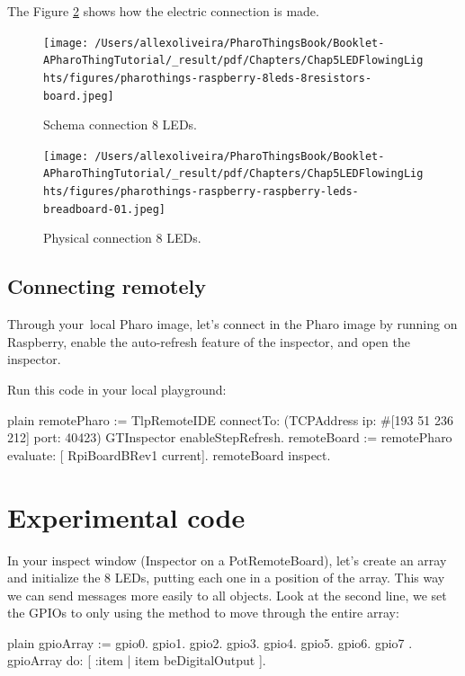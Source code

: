 \documentclass[10pt,twoside,english]{_support/latex/sbabook/sbabook}
\begin{document}
The Figure \ref{Physical8Leds} shows how the electric connection is made.


\begin{figure}

\begin{center}
\texttt{[image: /Users/allexoliveira/PharoThingsBook/Booklet-APharoThingTutorial/\_result/pdf/Chapters/Chap5LEDFlowingLights/figures/pharothings-raspberry-8leds-8resistors-board.jpeg]}\caption{Schema connection 8 LEDs.\label{Schema8Leds}}\end{center}
\end{figure}


\begin{figure}

\begin{center}
\texttt{[image: /Users/allexoliveira/PharoThingsBook/Booklet-APharoThingTutorial/\_result/pdf/Chapters/Chap5LEDFlowingLights/figures/pharothings-raspberry-raspberry-leds-breadboard-01.jpeg]}\caption{Physical connection 8 LEDs.\label{Physical8Leds}}\end{center}
\end{figure}

\subsection{Connecting remotely}
Through your local Pharo image, let's connect in the Pharo image by running on Raspberry, enable the auto-refresh feature of the inspector, and open the inspector.

Run this code in your local playground:

\begin{displaycode}{plain}
remotePharo := TlpRemoteIDE connectTo: (TCPAddress ip: #[193 51 236 212] port: 40423)
GTInspector enableStepRefresh.
remoteBoard := remotePharo evaluate: [ RpiBoardBRev1 current].
remoteBoard inspect.
\end{displaycode}
\section{Experimental code}
In your inspect window (Inspector on a PotRemoteBoard), let’s create an array and initialize the 8 LEDs, putting each one in a position of the array.  This way we can send messages more easily to all objects. Look at the second line, we set the GPIOs to  only using the method  to move through the entire array:

\begin{displaycode}{plain}
gpioArray := { gpio0. gpio1. gpio2. gpio3. gpio4. gpio5. gpio6. gpio7 }.
gpioArray do: [ :item | item beDigitalOutput ].
\end{displaycode}
\end{document}
